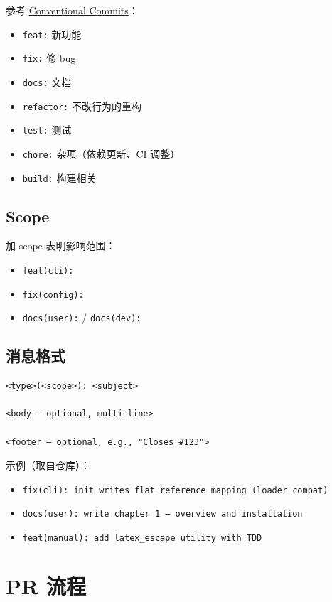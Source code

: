参考 \href{https://www.conventionalcommits.org}{Conventional Commits}：

\begin{itemize}
  \item \texttt{feat:} 新功能
  \item \texttt{fix:} 修 bug
  \item \texttt{docs:} 文档
  \item \texttt{refactor:} 不改行为的重构
  \item \texttt{test:} 测试
  \item \texttt{chore:} 杂项（依赖更新、CI 调整）
  \item \texttt{build:} 构建相关
\end{itemize}

\subsection{Scope}

加 scope 表明影响范围：

\begin{itemize}
  \item \texttt{feat(cli):}
  \item \texttt{fix(config):}
  \item \texttt{docs(user):} / \texttt{docs(dev):}
\end{itemize}

\subsection{消息格式}

\begin{verbatim}
<type>(<scope>): <subject>

<body — optional, multi-line>

<footer — optional, e.g., "Closes #123">
\end{verbatim}

示例（取自仓库）：

\begin{itemize}
  \item \texttt{fix(cli): init writes flat reference mapping (loader compat)}
  \item \texttt{docs(user): write chapter 1 — overview and installation}
  \item \texttt{feat(manual): add latex\_escape utility with TDD}
\end{itemize}

\section{PR 流程}


